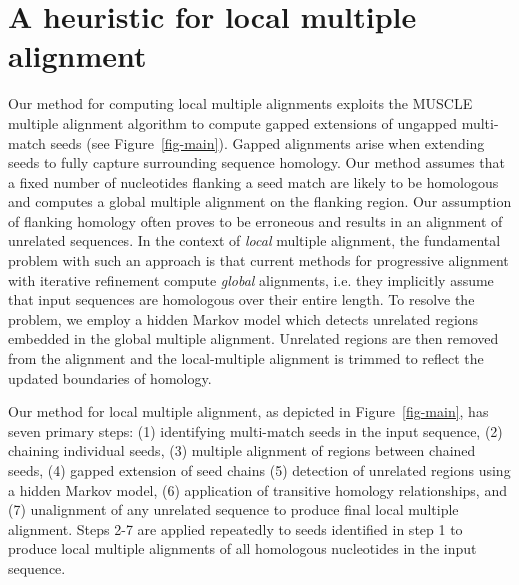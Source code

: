 \documentclass{ws-procs975x65}
\begin{document}
\section{A heuristic for local multiple alignment}
Our method for computing local multiple alignments exploits the MUSCLE
multiple alignment algorithm to compute gapped extensions of ungapped
multi-match seeds (see Figure~\ref{fig-main}). Gapped alignments arise
when extending seeds to fully capture surrounding sequence
homology. Our method assumes that a fixed number of nucleotides
flanking a seed match are likely to be homologous and computes a
global multiple alignment on the flanking region.  Our assumption of
flanking homology often proves to be erroneous and results in an
alignment of unrelated sequences.  In the context of \textit{local}
multiple alignment, the fundamental problem with such an approach is
that current methods for progressive alignment with iterative
refinement compute \textit{global} alignments, i.e. they implicitly
assume that input sequences are homologous over their entire length.
To resolve the problem, we employ a hidden Markov model which detects
unrelated regions embedded in the global multiple alignment.
Unrelated regions are then removed from the alignment and the
local-multiple alignment is trimmed to reflect the updated boundaries
of homology.

Our method for local multiple alignment, as depicted in
Figure~\ref{fig-main}, has seven primary steps: (1) identifying
multi-match seeds in the input sequence, (2) chaining individual
seeds, (3) multiple alignment of regions between chained seeds, (4)
gapped extension of seed chains (5) detection of unrelated regions
using a hidden Markov model, (6) application of transitive homology
relationships, and (7) unalignment of any unrelated sequence to
produce final local multiple alignment.  Steps 2-7 are applied
repeatedly to seeds identified in step 1 to produce local multiple
alignments of all homologous nucleotides in the input sequence.
\end{document}
